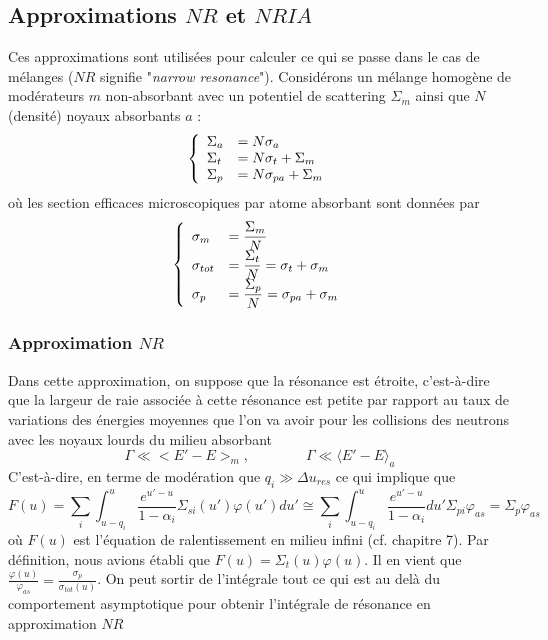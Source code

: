 	\subsection{Approximations $NR$ et $NRIA$}
	Ces approximations sont utilisées pour calculer ce qui se passe dans le cas de mélanges ($NR$
	signifie "\textit{narrow resonance}"). Considérons un mélange homogène de modérateurs $m$ 
	non-absorbant avec un potentiel de scattering $\Sigma_m$ ainsi que $N$ (densité) noyaux 
	absorbants $a$ :
	\begin{equation}
	\left\{\begin{array}{ll}
	{\Sigma _a} &\displaystyle= N{\sigma _a}\\
	{\Sigma _t} &\displaystyle= N{\sigma _t} + {\Sigma _m}\\
	{\Sigma _p} &\displaystyle= N{\sigma _{pa}} + {\Sigma _m}
	\end{array}\right.
	\end{equation}
	où les section efficaces microscopiques par atome absorbant sont données par
	\begin{equation}
	\left\{\begin{array}{ll}
	{\sigma _m} &\displaystyle= \frac{{{\Sigma _m}}}{N}\\
	{\sigma _{tot}} &\displaystyle= \frac{{{\Sigma _t}}}{N} = {\sigma _t} + {\sigma _m}\\
	{\sigma _p} &\displaystyle= \frac{{{\Sigma _p}}}{N} = {\sigma _{pa}} + {\sigma _m}
	\end{array}\right.
	\end{equation}
	
	\subsubsection{Approximation $NR$}
	Dans cette approximation, on suppose que la résonance est étroite, c'est-à-dire que la 
	largeur de raie associée à cette résonance est petite par rapport au taux de variations des 
	énergies moyennes que l'on va avoir pour les collisions des neutrons avec les noyaux lourds du 
	milieu absorbant
	\begin{equation}
	\Gamma \ll < E' - E{ > _m},\qquad\qquad \Gamma \ll \langle E'-E\rangle_a
	\end{equation}
	C'est-à-dire, en terme de modération que $q_i\gg \Delta u_{res}$ ce qui implique que
	\begin{equation}
	F(u) = \sum\limits_i    \int_{u - {q_i}}^u    \frac{{{e^{u' - u}}}}{{1 - {\alpha _i}}}{\Sigma
	_{si}}(u')\varphi (u')du'  \cong \sum\limits_i  \int_{u - {q_i}}^u  \frac{{{e^{u' - u}}}}{{1 -
	{\alpha _i}}}du'{\Sigma _{pi}}{\varphi _{as}} = {\Sigma _p}{\varphi _{as}}
	\end{equation}
	où $F(u)$ est l'équation de ralentissement en milieu infini (cf. chapitre 7). Par définition, 
	nous avions établi que $F(u) = {\Sigma _t}(u)\varphi (u)$. Il en vient que 
	$\frac{{\varphi (u)}}{{{\varphi _{as}}}} = \frac{{{\sigma _p}}}{{{\sigma _{tot}}(u)}}$. On 
	peut sortir de l'intégrale tout ce qui est au delà du comportement asymptotique pour obtenir 
	l'intégrale de résonance en approximation $NR$ \\
	
